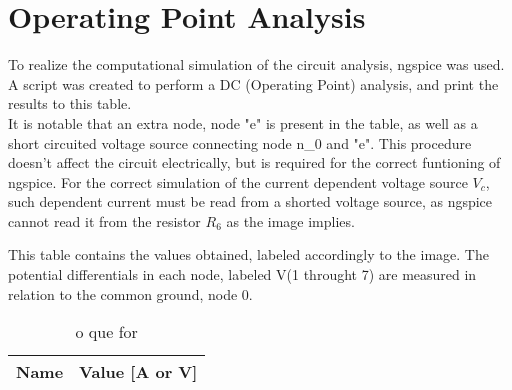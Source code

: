 \section{Operating Point Analysis}
\label{sec:simulation}

To realize the computational simulation of the circuit analysis, ngspice was used. A script was created to perform a DC (Operating Point) analysis, and print the results to this table.\\
It is notable that an extra node, node "e" is present in the table, as well as a short circuited voltage source connecting node n\_0 and "e". This procedure doesn't affect the circuit electrically, but is required for the correct funtioning of ngspice. For the correct simulation of the current dependent voltage source $V_{c}$, such dependent current must be read from a shorted voltage source, as ngspice cannot read it from the resistor $R_{6}$ as the image implies.

This table contains the values obtained, labeled accordingly to the image. The potential differentials in each node, labeled V(1 throught 7) are measured in relation to the common ground, node 0. 

\begin{table}[h]
  \centering
  \begin{tabular}{|l|r|}
    \hline    
    {\bf Name} & {\bf Value [A or V]} \\ \hline
    
  \end{tabular}
  \caption{o que for}
  \label{tab:op}
\end{table}



%

%
